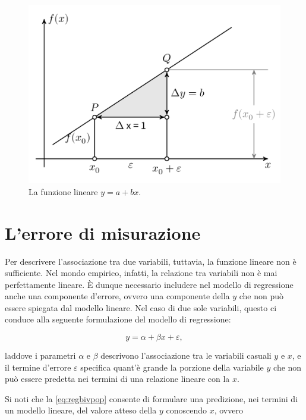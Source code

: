 \documentclass[
  10pt,
  italian,
  a4paper,
  extrafontsizes,onecolumn,openright
  ]{memoir}
\newlength{\rf}
\begin{document}
\begin{figure}[h]

{\centering \includegraphics[width=0.7\linewidth]{images/linear_function} 

}

\caption{La funzione lineare $y = a + bx$.}\label{fig:linearfunction}
\end{figure}

\hypertarget{lerrore-di-misurazione}{%
\section{L'errore di misurazione}\label{lerrore-di-misurazione}}

Per descrivere l'associazione tra due variabili, tuttavia, la funzione lineare non è sufficiente. Nel mondo empirico, infatti, la relazione tra variabili non è mai perfettamente lineare. È dunque necessario includere nel modello di regressione anche una componente d'errore, ovvero una componente della \(y\) che non può essere spiegata dal modello lineare. Nel caso di due sole variabili, questo ci conduce alla seguente formulazione del modello di regressione:

\begin{equation}
y = \alpha + \beta x + \varepsilon,
\label{eq:regbivpop}
\end{equation}

laddove i parametri \(\alpha\) e \(\beta\) descrivono l'associazione tra le variabili casuali \(y\) e \(x\), e il termine d'errore \(\varepsilon\) specifica quant'è grande la porzione della variabile \(y\) che non può essere predetta nei termini di una relazione lineare con la \(x\).

Si noti che la \eqref{eq:regbivpop} consente di formulare una predizione, nei termini di un modello lineare, del valore atteso della \(y\) conoscendo \(x\), ovvero
\end{document}
